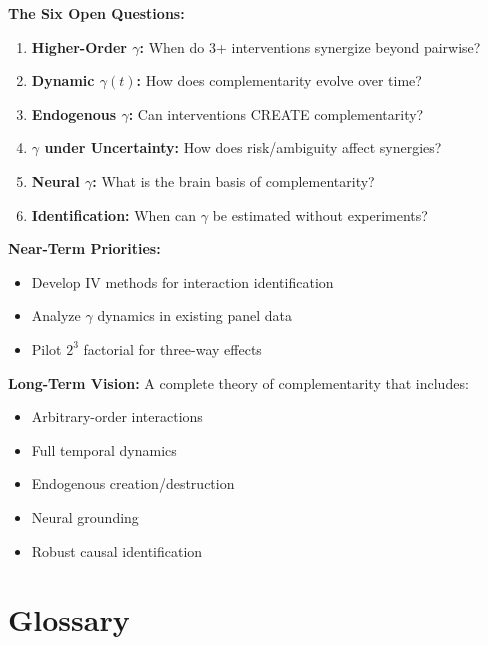 \begin{tcolorbox}[colback=gray!5!white,colframe=gray!75!black,title=\textbf{Summary: The Complementarity Research Frontier}]

\textbf{The Six Open Questions:}
\begin{enumerate}[noitemsep]
    \item \textbf{Higher-Order $\gamma$:} When do 3+ interventions synergize beyond pairwise?
    \item \textbf{Dynamic $\gamma(t)$:} How does complementarity evolve over time?
    \item \textbf{Endogenous $\gamma$:} Can interventions CREATE complementarity?
    \item \textbf{$\gamma$ under Uncertainty:} How does risk/ambiguity affect synergies?
    \item \textbf{Neural $\gamma$:} What is the brain basis of complementarity?
    \item \textbf{Identification:} When can $\gamma$ be estimated without experiments?
\end{enumerate}

\textbf{Near-Term Priorities:}
\begin{itemize}[noitemsep]
    \item Develop IV methods for interaction identification
    \item Analyze $\gamma$ dynamics in existing panel data
    \item Pilot $2^3$ factorial for three-way effects
\end{itemize}

\textbf{Long-Term Vision:}
A complete theory of complementarity that includes:
\begin{itemize}[noitemsep]
    \item Arbitrary-order interactions
    \item Full temporal dynamics
    \item Endogenous creation/destruction
    \item Neural grounding
    \item Robust causal identification
\end{itemize}

\end{tcolorbox}

\section{Glossary}
\label{sec:glossary}

